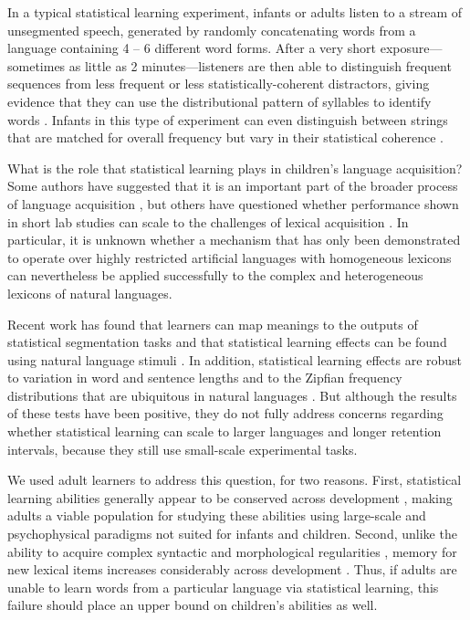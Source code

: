 \documentclass[10pt]{article}
\begin{document}
In a typical statistical learning experiment, infants or adults listen to a stream of unsegmented speech, generated by randomly concatenating words from a language containing 4 -- 6 different word forms. After a very short exposure---sometimes as little as 2 minutes---listeners are then able to distinguish frequent sequences from less frequent or less statistically-coherent distractors, giving evidence that they can use the distributional pattern of syllables to identify words \cite{saffran1996a,saffran1996b}. Infants in this type of experiment can even distinguish between strings that are matched for overall frequency but vary in their statistical coherence \cite{aslin1998}.

What is the role that statistical learning plays in children's language acquisition? Some authors have suggested that it is an important part of the broader process of language acquisition \cite{bates1996,saffran2003,kuhl2004}, but others have questioned whether performance shown in short lab studies can scale to the challenges of lexical acquisition \cite{johnson2010,yang2004,yang2008}. In particular, it is unknown whether a mechanism that has only been demonstrated to operate over highly restricted artificial languages with homogeneous lexicons can nevertheless be applied successfully to the complex and heterogeneous lexicons of natural languages. 

Recent work has found that learners can map meanings to the outputs of statistical segmentation tasks \cite{estes2007,mirman2008} and that statistical learning effects can be found using natural language stimuli \cite{pelucchi2009}. In addition, statistical learning effects are robust to variation in word and sentence lengths \cite{frank2010} and to the Zipfian frequency distributions that are ubiquitous in natural languages \cite{kurumada2011}. But although the results of these tests have been positive, they do not fully address concerns regarding whether statistical learning can scale to larger languages and longer retention intervals, because they still use small-scale experimental tasks.

We used adult learners to address this question, for two reasons. First, statistical learning abilities generally appear to be conserved across development \cite{saffran1996a,saffran1996b,saffran1997}, making adults a viable population for studying these abilities using large-scale and psychophysical paradigms not suited for infants and children. Second, unlike the ability to acquire complex syntactic and morphological regularities \cite{johnson1989}, memory for new lexical items increases considerably across development \cite{snow1978,gathercole2004}. Thus, if adults are unable to learn words from a particular language via statistical learning, this failure should place an upper bound on children's abilities as well.
\end{document}

